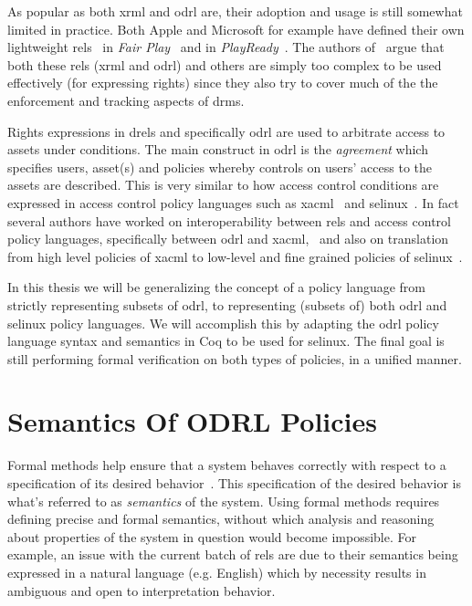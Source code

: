 As popular as both \ac{xrml} and \ac{odrl} are, their adoption and usage is still somewhat limited in practice. Both Apple and Microsoft for example have defined their own lightweight \ac{rel}s~\cite{problemwithrels} in \emph{Fair Play}~\cite{fairplay} and in \emph{PlayReady}~\cite{playready}. The authors of~\cite{problemwithrels} argue that both these \ac{rel}s (\ac{xrml} and \ac{odrl}) and others are simply too complex to be used effectively (for expressing rights) since they also try to cover much of the the enforcement and tracking aspects of \ac{drm}s.

Rights expressions in \ac{drel}s and specifically \ac{odrl} are used to arbitrate access to assets under conditions. The main construct in \ac{odrl} is the \emph{agreement} which specifies users, asset(s) and policies whereby controls on users' access to the assets are described. This is very similar to how access control conditions are expressed in access control policy languages such as \ac{xacml}~\cite{xacml} and \ac{selinux}~\cite{selinux}. In fact several authors have worked on interoperability between \ac{rel}s and access control policy languages, specifically between \ac{odrl} and \ac{xacml},~\cite{prados2005interoperability, maronas2009architecture} and also on translation from high level policies of \ac{xacml} to low-level and fine grained policies of \ac{selinux}~\cite{alam2008usage}. 

In this thesis we will be generalizing the concept of a policy language from strictly representing subsets of \ac{odrl}, to representing (subsets of) both \ac{odrl} and \ac{selinux} policy languages. We will accomplish this by adapting the \ac{odrl} policy language syntax and semantics in Coq to be used for \ac{selinux}. The final goal is still performing formal verification on both types of policies, in a unified manner.



\section{Semantics Of ODRL Policies}


Formal methods help ensure that a system behaves correctly with respect to a specification of its desired behavior~\cite{TAPL}. This specification of the desired behavior is what's referred to as \emph{semantics} of the system. Using formal methods requires defining precise and formal semantics, without which analysis and reasoning about properties of the system in question would become impossible. For example, an issue with the current batch of \ac{rel}s are due to their semantics being expressed in a natural language (e.g. English) which by necessity results in ambiguous and open to interpretation behavior. 

